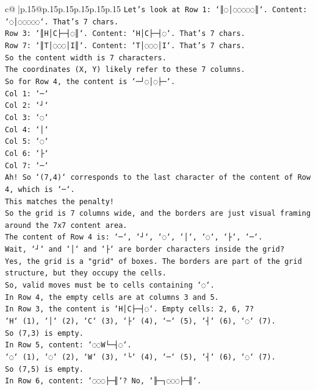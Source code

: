 \documentclass{article}
\begin{document}
{\begin{supertabular}{c@{$\;$}|p{.15\linewidth}@{}p{.15\linewidth}p{.15\linewidth}p{.15\linewidth}p{.15\linewidth}p{.15\linewidth}}
{{{\texttt{Let's look at Row 1: `║◌│◌◌◌◌◌║`. Content: `◌│◌◌◌◌◌`. That's 7 chars.} \\
\texttt{Row 3: `║H│C├─┤◌║`. Content: `H│C├─┤◌`. That's 7 chars.} \\
\texttt{Row 7: `║T│◌◌◌│I║`. Content: `T│◌◌◌│I`. That's 7 chars.} \\
\texttt{So the content width is 7 characters.} \\
\texttt{The coordinates (X, Y) likely refer to these 7 columns.} \\
\texttt{So for Row 4, the content is `─┘◌│◌├─`.} \\
\texttt{Col 1: `─`} \\
\texttt{Col 2: `┘`} \\
\texttt{Col 3: `◌`} \\
\texttt{Col 4: `│`} \\
\texttt{Col 5: `◌`} \\
\texttt{Col 6: `├`} \\
\texttt{Col 7: `─`} \\
\texttt{Ah! So `(7,4)` corresponds to the last character of the content of Row 4, which is `─`.} \\
\texttt{This matches the penalty!} \\
\texttt{So the grid is 7 columns wide, and the borders are just visual framing around the 7x7 content area.} \\
\texttt{The content of Row 4 is: `─`, `┘`, `◌`, `│`, `◌`, `├`, `─`.} \\
\texttt{Wait, `┘` and `│` and `├` are border characters inside the grid?} \\
\texttt{Yes, the grid is a "grid" of boxes. The borders are part of the grid structure, but they occupy the cells.} \\
\texttt{So, valid moves must be to cells containing `◌`.} \\
\texttt{In Row 4, the empty cells are at columns 3 and 5.} \\
\texttt{In Row 3, the content is `H│C├─┤◌`. Empty cells: 2, 6, 7?} \\
\texttt{`H` (1), `│` (2), `C` (3), `├` (4), `─` (5), `┤` (6), `◌` (7).} \\
\texttt{So (7,3) is empty.} \\
\texttt{In Row 5, content: `◌◌W└─┤◌`.} \\
\texttt{`◌` (1), `◌` (2), `W` (3), `└` (4), `─` (5), `┤` (6), `◌` (7).} \\
\texttt{So (7,5) is empty.} \\
\texttt{In Row 6, content: `◌◌◌├─╢`? No, `╟─┐◌◌◌├─╢`.} \\
}}}
\end{supertabular}}
\end{document}
